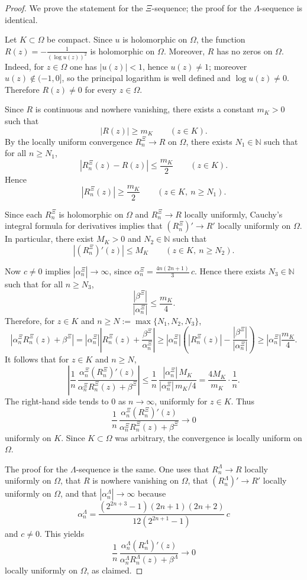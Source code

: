 \documentclass[11pt,twoside]{article}
\numberwithin{equation}{section}
\begin{document}
\begin{proof}
We prove the statement for the \(\Xi\)-sequence; the proof for the \(\Lambda\)-sequence is identical.

Let \(K\subset\Omega\) be compact. Since \(u\) is holomorphic on \(\Omega\), the function \(\displaystyle R(z)=-\frac{1}{(\log u(z))^2}\) is holomorphic on \(\Omega\). Moreover, \(R\) has no zeros on \(\Omega\). Indeed, for \(z\in\Omega\) one has \(|u(z)|<1\), hence \(u(z)\neq 1\); moreover \(u(z)\notin(-1,0]\), so the principal logarithm is well defined and \(\log u(z)\neq 0\). Therefore \(R(z)\neq 0\) for every \(z\in\Omega\).

Since \(R\) is continuous and nowhere vanishing, there exists a constant \(m_K>0\) such that
\[
|R(z)|\ge m_K
\qquad (z\in K).
\]
By the locally uniform convergence \(R_n^\Xi\to R\) on \(\Omega\), there exists \(N_1\in\mathbb N\) such that for all \(n\ge N_1\),
\[
|R_n^\Xi(z)-R(z)|\le \frac{m_K}{2}
\qquad (z\in K).
\]
Hence
\[
|R_n^\Xi(z)|\ge \frac{m_K}{2}
\qquad (z\in K,\ n\ge N_1).
\]

Since each \(R_n^\Xi\) is holomorphic on \(\Omega\) and \(R_n^\Xi\to R\) locally uniformly, Cauchy's integral formula for derivatives implies that \((R_n^\Xi)'\to R'\) locally uniformly on \(\Omega\). In particular, there exist \(M_K>0\) and \(N_2\in\mathbb N\) such that
\[
|(R_n^\Xi)'(z)|\le M_K
\qquad (z\in K,\ n\ge N_2).
\]

Now \(c\neq 0\) implies \(|\alpha_n^\Xi|\to\infty\), since \(\displaystyle \alpha_n^\Xi=\frac{4n(2n+1)}{3}\,c\). Hence there exists \(N_3\in\mathbb N\) such that for all \(n\ge N_3\),
\[
\frac{|\beta^\Xi|}{|\alpha_n^\Xi|}\le \frac{m_K}{4}.
\]
Therefore, for \(z\in K\) and \(n\ge N:=\max\{N_1,N_2,N_3\}\),
\[
\left|\alpha_n^\Xi R_n^\Xi(z)+\beta^\Xi\right|
=
|\alpha_n^\Xi|
\left|R_n^\Xi(z)+\frac{\beta^\Xi}{\alpha_n^\Xi}\right|
\ge
|\alpha_n^\Xi|
\left(
|R_n^\Xi(z)|-\frac{|\beta^\Xi|}{|\alpha_n^\Xi|}
\right)
\ge
|\alpha_n^\Xi|\frac{m_K}{4}.
\]
It follows that for \(z\in K\) and \(n\ge N\),
\[
\left|
\frac1n\,
\frac{\alpha_n^\Xi (R_n^\Xi)'(z)}
{\alpha_n^\Xi R_n^\Xi(z)+\beta^\Xi}
\right|
\le
\frac1n\,
\frac{|\alpha_n^\Xi|\,M_K}{|\alpha_n^\Xi|\,m_K/4}
=
\frac{4M_K}{m_K}\cdot \frac1n.
\]
The right-hand side tends to \(0\) as \(n\to\infty\), uniformly for \(z\in K\). Thus
\[
\frac1n\,
\frac{\alpha_n^\Xi (R_n^\Xi)'(z)}
{\alpha_n^\Xi R_n^\Xi(z)+\beta^\Xi}
\longrightarrow 0
\]
uniformly on \(K\). Since \(K\subset\Omega\) was arbitrary, the convergence is locally uniform on \(\Omega\).

The proof for the \(\Lambda\)-sequence is the same. One uses that \(R_n^\Lambda\to R\) locally uniformly on \(\Omega\), that \(R\) is nowhere vanishing on \(\Omega\), that \((R_n^\Lambda)'\to R'\) locally uniformly on \(\Omega\), and that \(|\alpha_n^\Lambda|\to\infty\) because
\[
\alpha_n^\Lambda=
\frac{(2^{2n+3}-1)(2n+1)(2n+2)}{12(2^{2n+1}-1)}\,c
\]
and \(c\neq 0\). This yields
\[
\frac1n\,
\frac{\alpha_n^\Lambda (R_n^\Lambda)'(z)}
{\alpha_n^\Lambda R_n^\Lambda(z)+\beta^\Lambda}
\longrightarrow 0
\]
locally uniformly on \(\Omega\), as claimed.
\end{proof}
\end{document}
